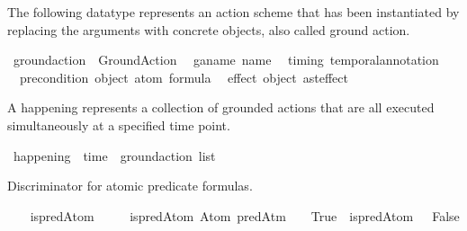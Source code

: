 \begin{isabellebody}
%
\endisadelimdocument
%
\isatagdocument
%
\isamarkuptrue%
%
\endisatagdocument
{\isafolddocument}%
%
\isadelimdocument
%
\endisadelimdocument
%
\begin{isamarkuptext}%
The following datatype represents an action scheme that has been
  instantiated by replacing the arguments with concrete objects,
  also called ground action.%
\end{isamarkuptext}\isamarkuptrue%
\isamarkupfalse%
\ ground{\isacharunderscore}{\kern0pt}action\ {\isacharequal}{\kern0pt}\ Ground{\isacharunderscore}{\kern0pt}Action\isanewline
\ \ {\isacharparenleft}{\kern0pt}ga{\isacharunderscore}{\kern0pt}name{\isacharcolon}{\kern0pt}\ name{\isacharparenright}{\kern0pt}\isanewline
\ \ {\isacharparenleft}{\kern0pt}timing{\isacharcolon}{\kern0pt}\ temporal{\isacharunderscore}{\kern0pt}annotation{\isacharparenright}{\kern0pt}\isanewline
\ \ {\isacharparenleft}{\kern0pt}precondition{\isacharcolon}{\kern0pt}\ {\isachardoublequoteopen}{\isacharparenleft}{\kern0pt}object\ atom{\isacharparenright}{\kern0pt}\ formula{\isachardoublequoteclose}{\isacharparenright}{\kern0pt}\isanewline
\ \ {\isacharparenleft}{\kern0pt}effect{\isacharcolon}{\kern0pt}\ {\isachardoublequoteopen}object\ ast{\isacharunderscore}{\kern0pt}effect{\isachardoublequoteclose}{\isacharparenright}{\kern0pt}%
\begin{isamarkuptext}%
A happening represents a collection of grounded actions that are all
   executed simultaneously at a specified time point.%
\end{isamarkuptext}\isamarkuptrue%
\isamarkupfalse%
\ happening\ {\isacharequal}{\kern0pt}\ {\isachardoublequoteopen}time\ {\isasymtimes}\ {\isacharparenleft}{\kern0pt}ground{\isacharunderscore}{\kern0pt}action\ list{\isacharparenright}{\kern0pt}{\isachardoublequoteclose}%
\isadelimdocument
%
\endisadelimdocument
%
\isatagdocument
%
\isamarkuptrue%
%
\endisatagdocument
{\isafolddocument}%
%
\isadelimdocument
%
\endisadelimdocument
%
\begin{isamarkuptext}%
Discriminator for atomic predicate formulas.%
\end{isamarkuptext}\isamarkuptrue%
\ \ \isamarkupfalse%
\ is{\isacharunderscore}{\kern0pt}predAtom\ \isanewline
\ \ \ \ {\isachardoublequoteopen}is{\isacharunderscore}{\kern0pt}predAtom\ {\isacharparenleft}{\kern0pt}Atom\ {\isacharparenleft}{\kern0pt}predAtm\ {\isacharunderscore}{\kern0pt}\ {\isacharunderscore}{\kern0pt}{\isacharparenright}{\kern0pt}{\isacharparenright}{\kern0pt}\ {\isacharequal}{\kern0pt}\ True{\isachardoublequoteclose}\ {\isacharbar}{\kern0pt}\ {\isachardoublequoteopen}is{\isacharunderscore}{\kern0pt}predAtom\ {\isacharunderscore}{\kern0pt}\ {\isacharequal}{\kern0pt}\ False{\isachardoublequoteclose}\isanewline

\end{isabellebody}
